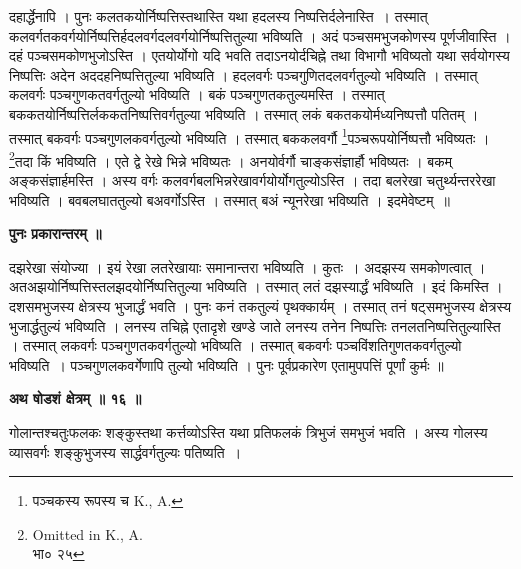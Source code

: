 \documentclass[11pt, openany]{book}
\begin{document}
\noindent दहार्द्धेनापि । पुनः कलतकयोर्निष्पत्तिस्तथास्ति यथा हदलस्य निष्पत्तिर्दलेनास्ति~। तस्मात् कलवर्गतकवर्गयोर्निष्पत्तिर्हदलवर्गदलवर्गयोर्निष्पत्तितुल्या भविष्यति । अदं पञ्चसमभुजकोणस्य पूर्णजीवास्ति । दहं पञ्चसमकोणभुजोऽस्ति । एतयोर्योगो यदि भवति तदाऽनयोर्दचिह्ने तथा विभागौ भविष्यतो यथा सर्वयोगस्य निष्पत्तिः अदेन अददहनिष्पत्तितुल्या भविष्यति । हदलवर्गः पञ्चगुणितदलवर्गतुल्यो भविष्यति । तस्मात् कलवर्गः पञ्चगुणकतवर्गतुल्यो भविष्यति । बकं पञ्चगुणतकतुल्यमस्ति । तस्मात् बककतयोर्निष्पत्तिर्लककतनिष्पत्तिवर्गतुल्या भविष्यति । तस्मात् लकं बकतकयोर्मध्यनिष्पत्तौ पतितम् । तस्मात् बकवर्गः पञ्चगुणलकवर्गतुल्यो भविष्यति । तस्मात् बककलवर्गौ \renewcommand{\thefootnote}{१}\footnote{पञ्चकस्य रूपस्य च {\en K., A.} }पञ्चरूपयोर्निष्पत्तौ भविष्यतः । \renewcommand{\thefootnote}{२}\footnote{{\en Omitted in K., A.}\\
भा० २५}तदा किं भविष्यति । एते द्वे रेखे भिन्ने भविष्यतः । अनयोर्वर्गौ चाङ्कसंज्ञार्हौ भविष्यतः । बकम् अङ्कसंज्ञार्हमस्ति । अस्य वर्गः कलवर्गबलभिन्नरेखावर्गयोर्योगतुल्योऽस्ति । तदा बलरेखा चतुर्थ्यन्तररेखा भविष्यति । बवबलघाततुल्यो बअवर्गोऽस्ति । तस्मात् बअं न्यूनरेखा भविष्यति । इदमेवेष्टम्~॥


\newpage
\begin{center}
\textbf{\large पुनः प्रकारान्तरम् ॥}
\end{center}
\vspace{3mm}

दझरेखा संयोज्या । इयं रेखा लतरेखायाः समानान्तरा भविष्यति । कुतः~। अदझस्य समकोणत्वात् । अतअझयोर्निष्पत्तिस्तलझदयोर्निष्पत्तितुल्या भविष्यति । तस्मात् लतं दझस्यार्द्धं भविष्यति । इदं किमस्ति । दशसमभुजस्य क्षेत्रस्य भुजार्द्धं भवति । पुनः कनं तकतुल्यं पृथक्कार्यम् । तस्मात् तनं षट्समभुजस्य क्षेत्रस्य भुजार्द्धतुल्यं भविष्यति । लनस्य तचिह्ने एतादृशे खण्डे जाते लनस्य तनेन निष्पत्तिः तनलतनिष्पत्तितुल्यास्ति । तस्मात् लकवर्गः पञ्चगुणतकवर्गतुल्यो भविष्यति । तस्मात् बकवर्गः पञ्चविंशतिगुणतकवर्गतुल्यो भविष्यति~। पञ्चगुणलकवर्गेणापि तुल्यो भविष्यति । पुनः पूर्वप्रकारेण
एतामुपपत्तिं पूर्णां कुर्मः ॥\\
\vspace{3mm}

\begin{center}
\textbf{\large अथ षोडशं क्षेत्रम् ॥ १६ ॥ }
\end{center}
\vspace{5mm}

{\ab गोलान्तश्चतुःफलकः शङ्कुस्तथा कर्त्तव्योऽस्ति यथा प्रतिफलकं त्रिभुजं समभुजं भवति । अस्य गोलस्य व्यासवर्गः शङ्कुभुजस्य सार्द्धवर्गतुल्यः पतिष्यति~। }\\
\vspace{3mm}
\end{document}
